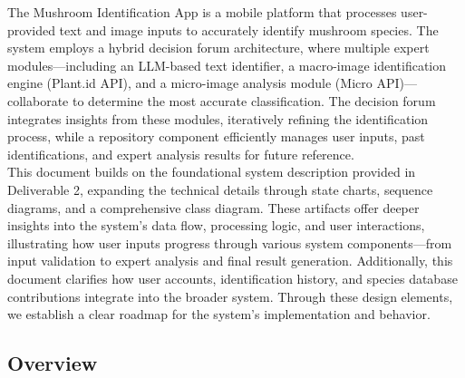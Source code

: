 \documentclass[]{article}
\begin{document}
The Mushroom Identification App is a mobile platform that processes user-provided text and image inputs to accurately identify mushroom species. The system employs a hybrid decision forum architecture, where multiple expert modules—including an LLM-based text identifier, a macro-image identification engine (Plant.id API), and a micro-image analysis module (Micro API)—collaborate to determine the most accurate classification. The decision forum integrates insights from these modules, iteratively refining the identification process, while a repository component efficiently manages user inputs, past identifications, and expert analysis results for future reference.\\

This document builds on the foundational system description provided in Deliverable 2, expanding the technical details through state charts, sequence diagrams, and a comprehensive class diagram. These artifacts offer deeper insights into the system’s data flow, processing logic, and user interactions, illustrating how user inputs progress through various system components—from input validation to expert analysis and final result generation. Additionally, this document clarifies how user accounts, identification history, and species database contributions integrate into the broader system. Through these design elements, we establish a clear roadmap for the system’s implementation and behavior.

\subsection{Overview}
\label{sub:overview}
\end{document}
